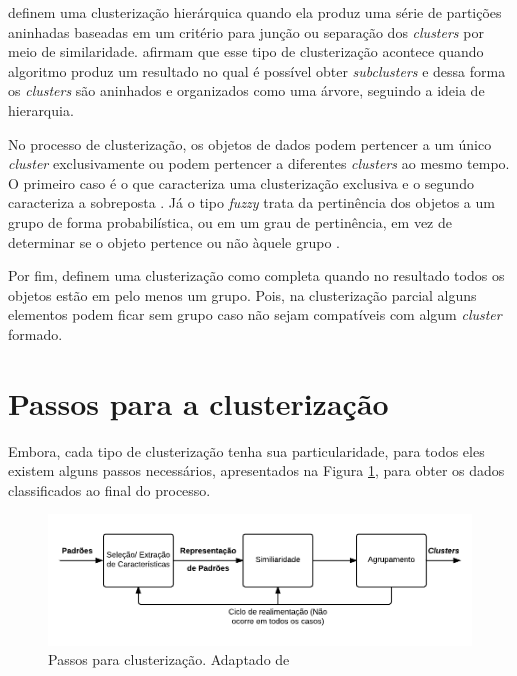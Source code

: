  definem uma clusterização hierárquica quando ela produz uma série
de partições aninhadas baseadas em um critério para junção ou separação dos \textit{clusters} por meio de similaridade. 
 afirmam que esse tipo de clusterização acontece quando algoritmo
produz um resultado no qual é possível obter \textit{subclusters} e dessa forma os \textit{clusters} são aninhados
e organizados como uma árvore, seguindo a ideia de hierarquia.

No processo de clusterização, os objetos de dados podem pertencer a um único \textit{cluster} exclusivamente ou podem
pertencer a diferentes \textit{clusters} ao mesmo tempo. O primeiro caso é o que caracteriza uma clusterização exclusiva e o segundo caracteriza a sobreposta \cite{tan2013data}. 
Já o tipo \textit{fuzzy} trata da pertinência dos objetos a um grupo de forma probabilística, 
ou em um grau de pertinência, em vez de determinar se o objeto pertence ou não àquele grupo \cite{tan2013data, clustering_review}.

Por fim,  definem uma clusterização como completa quando no resultado todos os objetos estão em pelo menos um grupo. 
Pois, na clusterização parcial alguns elementos podem ficar sem grupo caso não sejam compatíveis com algum \textit{cluster} formado.

\section{Passos para a clusterização}

Embora, cada tipo de clusterização tenha sua particularidade, para todos eles existem alguns passos necessários, apresentados na Figura \ref{fig:tasks_clustering}, 
para obter os dados classificados ao final do processo.

\begin{figure}[h]
\centering
\includegraphics[scale=0.5]{figuras/tasks_clustering.png}
\caption{Passos para clusterização. Adaptado de }
\label{fig:tasks_clustering}
\end{figure}

